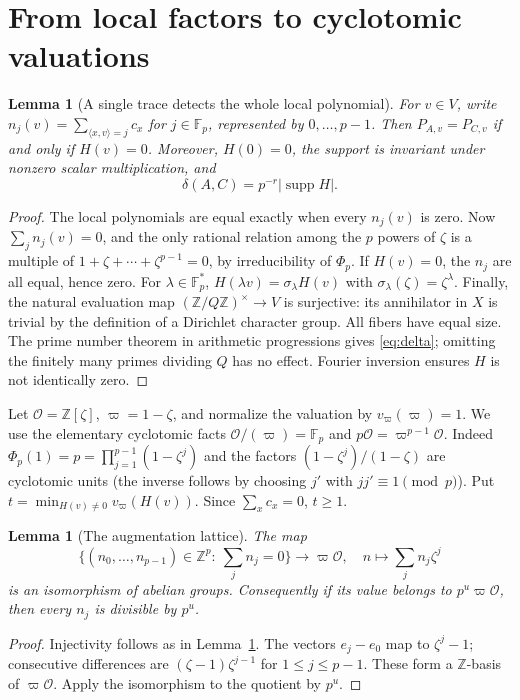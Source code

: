 \documentclass[11pt]{article}
\newtheorem{lemma}[theorem]{Lemma}
\theoremstyle{remark}\newtheorem{remark}[theorem]{Remark}
\newcommand{\F}{\mathbb F}
\newcommand{\Z}{\mathbb Z}
\newcommand{\supp}{\operatorname{supp}}
\newcommand{\vp}{v_{\varpi}}
\begin{document}
\section{From local factors to cyclotomic valuations}
\begin{lemma}[A single trace detects the whole local polynomial]\label{lem:local}
For $v\in V$, write $n_j(v)=\sum_{\langle x,v\rangle=j} c_x$ for $j\in\F_p$, represented by $0,\ldots,p-1$. Then $P_{A,v}=P_{C,v}$ if and only if $H(v)=0$. Moreover, $H(0)=0$, the support is invariant under nonzero scalar multiplication, and
\begin{equation}\label{eq:delta}
 \delta(A,C)=p^{-r}|\supp H|.
\end{equation}
\end{lemma}
\begin{proof}
The local polynomials are equal exactly when every $n_j(v)$ is zero. Now $\sum_j n_j(v)=0$, and the only rational relation among the $p$ powers of $\zeta$ is a multiple of $1+\zeta+\cdots+\zeta^{p-1}=0$, by irreducibility of $\Phi_p$. If $H(v)=0$, the $n_j$ are all equal, hence zero. For $\lambda\in\F_p^*$, $H(\lambda v)=\sigma_\lambda H(v)$ with $\sigma_\lambda(\zeta)=\zeta^\lambda$. Finally, the natural evaluation map $(\Z/Q\Z)^\times\to V$ is surjective: its annihilator in $X$ is trivial by the definition of a Dirichlet character group. All fibers have equal size. The prime number theorem in arithmetic progressions gives \eqref{eq:delta}; omitting the finitely many primes dividing $Q$ has no effect. Fourier inversion ensures $H$ is not identically zero.
\end{proof}

Let $\mathcal O=\Z[\zeta]$, $\varpi=1-\zeta$, and normalize the valuation by $v_{\varpi}(\varpi)=1$. We use the elementary cyclotomic facts $\mathcal O/(\varpi)=\F_p$ and $p\mathcal O=\varpi^{p-1}\mathcal O$. Indeed $\Phi_p(1)=p=\prod_{j=1}^{p-1}(1-\zeta^j)$ and the factors $(1-\zeta^j)/(1-\zeta)$ are cyclotomic units (the inverse follows by choosing $j'$ with $jj'\equiv1\pmod p$). Put $t=\min_{H(v)\ne0}\vp(H(v))$. Since $\sum_xc_x=0$, $t\ge1$.

\begin{lemma}[The augmentation lattice]\label{lem:aug}
The map
\[
 \{(n_0,\ldots,n_{p-1})\in\Z^p:\ \sum_j n_j=0\}\longrightarrow\varpi\mathcal O,
 \quad n\longmapsto \sum_j n_j\zeta^j
\]
is an isomorphism of abelian groups. Consequently if its value belongs to $p^u\varpi\mathcal O$, then every $n_j$ is divisible by $p^u$.
\end{lemma}
\begin{proof}
Injectivity follows as in Lemma~\ref{lem:local}. The vectors $e_j-e_0$ map to $\zeta^j-1$; consecutive differences are $(\zeta-1)\zeta^{j-1}$ for $1\le j\le p-1$. These form a $\Z$-basis of $\varpi\mathcal O$. Apply the isomorphism to the quotient by $p^u$.
\end{proof}
\end{document}
